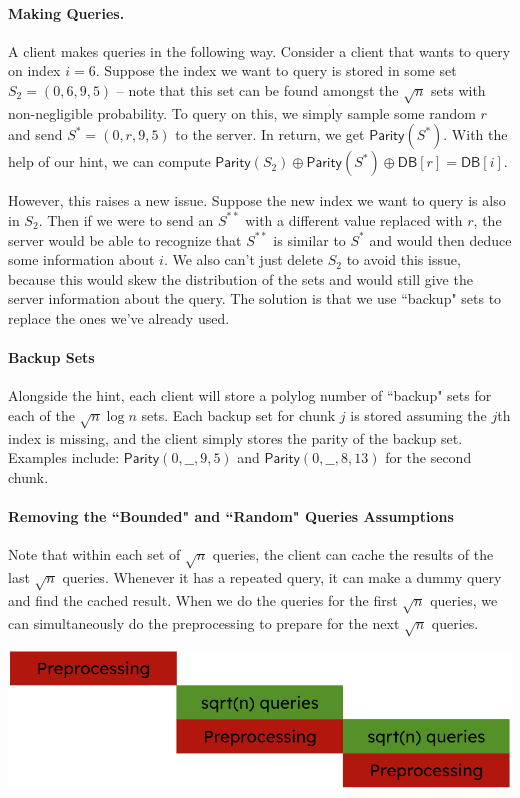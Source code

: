 \paragraph{Making Queries.}
A client makes queries in the following way. Consider a client that wants to query on index $i = 6$. Suppose the index we want to query is stored in some set $S_2 = (0, 6, 9, 5)$ -- note that this set can be found amongst the $\sqrt{n}$ sets with non-negligible probability. To query on this, we simply sample some random $r$ and send $S^* = (0, r, 9, 5)$ to the server. In return, we get $\mathsf{Parity}(S^*)$. With the help of our hint, we can compute $\mathsf{Parity}(S_2) \oplus \mathsf{Parity}(S^*) \oplus \mathsf{DB}[r] = \mathsf{DB}[i]$.

However, this raises a new issue. Suppose the new index we want to query is also in $S_2$. Then if we were to send an $S^{**}$ with a different value replaced with $r$, the server would be able to recognize that $S^{**}$ is similar to $S^*$ and would then deduce some information about $i$. We also can't just delete $S_2$ to avoid this issue, because this would skew the distribution of the sets and would still give the server information about the query. The solution is that we use ``backup" sets to replace the ones we've already used.

\paragraph{Backup Sets}
Alongside the hint, each client will store a polylog number of ``backup" sets for each of the $\sqrt{n}\log n$ sets. Each backup set for chunk $j$ is stored assuming the $j$th index is missing, and the client simply stores the parity of the backup set. Examples include: $\mathsf{Parity}(0, \_\_, 9, 5)$ and $\mathsf{Parity}(0, \_\_, 8, 13)$ for the second chunk. 

\paragraph{Removing the ``Bounded" and ``Random" Queries Assumptions}
Note that within each set of $\sqrt{n}$ queries, the client can cache the results of the last $\sqrt{n}$ queries. Whenever it has a repeated query, it can make a dummy query and find the cached result. When we do the queries for the first $\sqrt{n}$ queries, we can simultaneously do the preprocessing to prepare for the next $\sqrt{n}$ queries.

\begin{center}
    \includegraphics[scale=0.77]{scrbimg.png}
\end{center}

